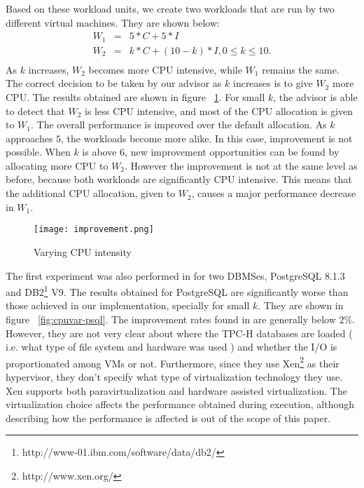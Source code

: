 Based on these workload units, we create two workloads that are run by two different virtual machines. They are shown below:
\begin{eqnarray*}
 W_{1} &=& 5*C + 5*I \\
 W_{2} &=& k*C + (10-k)*I, 0 \leq k \leq 10. \\
\end{eqnarray*}
As $k$ increases, $W_{2}$ becomes more CPU intensive, while $W_{1}$ remains the same. The correct decision to be taken by our advisor as $k$ increases is to give $W_{2}$ more CPU. The results obtained are shown in figure ~\ref{fig:intensity}. For small $k$, the advisor is able to detect that $W_{2}$ is less CPU intensive, and most of the CPU allocation is given to $W_{1}$. The overall performance is improved  over the default allocation. As $k$ approaches $5$, the workloads become more alike. In this case, improvement is not possible. When $k$ is above $6$, new improvement  opportunities can be found by allocating more CPU to $W_{2}$. However the improvement is not at the same level as before, because both workloads are significantly CPU intensive. This means that the additional CPU allocation, given to $W_{2}$, causes a major performance decrease in $W_{1}$.

\begin{figure}[ht]
 \centering
 \texttt{[image: improvement.png]}
 \caption{Varying CPU intensity}
 \label{fig:intensity}
\end{figure} 

The first experiment was also performed in \cite{Soror:2008:AVM:1376616.1376711} for two DBMSes, PostgreSQL 8.1.3 and DB2\footnote{http://www-01.ibm.com/software/data/db2/} V9.  The results obtained for PostgreSQL are significantly worse than those achieved in our implementation, specially for small $k$. They are shown in figure ~\ref{fig:cpuvar-psql}. The improvement rates found in \cite{Soror:2008:AVM:1376616.1376711} are generally below $2\%$. However, they are not very clear about where the TPC-H databases are loaded ( i.e. what type of file system and hardware was used ) and whether the I/O is proportionated among VMs or not. Furthermore, since they use Xen\footnote{http://www.xen.org/} as their hypervisor, they don't specify what type of virtualization technology they use. Xen supports both paravirtualization and hardware assisted virtualization. The virtualization choice affects the performance obtained during execution, although describing how the performance is affected is out of the scope of this paper.

